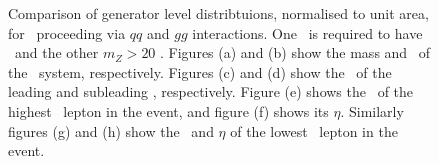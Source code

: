 \begin{figure}
{    }
        \vspace{-2mm}
        \vspace{-2mm}
    \caption{\small Comparison of generator level distribtuions, normalised to
    unit area, for \ZZsllll\ proceeding via $qq$ and $gg$ interactions. One \Z\ is required to have \sstooos\ and the other
    $m_{Z}>20$ \gev. Figures (a)
    and (b) show the mass and \pt\ of the \ZZ\ system,
    respectively. Figures (c) and (d) show the \pt\ of the
    leading and subleading \Z, respectively. Figure (e) shows the \pt\ of the highest \pt\ lepton in the event, and figure (f) shows its
   $\eta$. Similarly figures (g) and (h) show the \pt\ and $\eta$ of the lowest
   \pt\ lepton in the event.}
    \label{fig:gen-comp-7-8-ZZs}
\end{figure}

